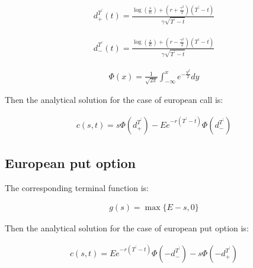 \documentclass[11pt,a4paper]{extarticle}
\begin{document}
\begin{equation}
    \begin{aligned}
    d_{+}^{T^\prime}(t)=\frac{\log(\frac{s}{E})+(r+\frac{\gamma^2}{2})(T^\prime-t)}{\gamma\sqrt{T^\prime-t}}
    \end{aligned}
    \end{equation}

\begin{equation}
    \begin{aligned}
    d_{-}^{T^\prime}(t)=\frac{\log(\frac{s}{E})+(r-\frac{\gamma^2}{2})(T^\prime-t)}{\gamma\sqrt{T^\prime-t}}
    \end{aligned}
    \end{equation}

\begin{equation}
    \begin{aligned}
    \Phi(x)=\frac{1}{\sqrt{2\pi}}\int_{-\infty}^xe^{-\frac{y^2}{2}}dy
    \end{aligned}
    \end{equation}

Then the analytical solution for the case of european call is:

\begin{equation}
    \begin{aligned}
    c(s,t) = s\Phi(d_{+}^{T^\prime})-Ee^{-r(T^\prime-t)}\Phi(d_{-}^{T^\prime})
    \end{aligned}
    \end{equation}

\subsection{European put option}

The corresponding terminal function is:

\begin{equation}
    \begin{aligned}
    g(s)=\max\{E-s, 0\}
    \end{aligned}
    \end{equation}

Then the analytical solution for the case of european put option is:

\begin{equation}
    \begin{aligned}
    c(s,t) = Ee^{-r(T^\prime-t)}\Phi(-d_{-}^{T^\prime})-s\Phi(-d_{+}^{T^\prime})
    \end{aligned}
    \end{equation}
\end{document}

